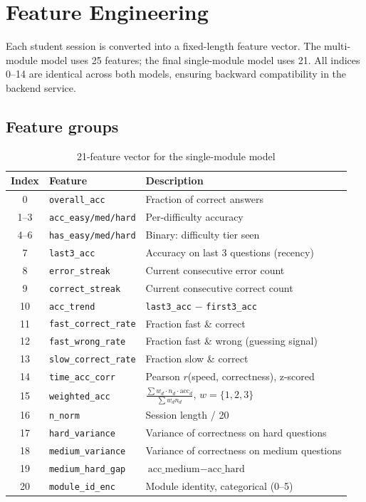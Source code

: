 \documentclass[12pt,a4paper]{article}
\begin{document}
\section{Feature Engineering}
\label{sec:features}

Each student session is converted into a fixed-length feature vector.
The multi-module model uses 25 features; the final single-module model uses 21.
All indices 0--14 are identical across both models, ensuring backward compatibility
in the backend service.

\subsection{Feature groups}

\begin{table}[H]
\centering
\caption{21-feature vector for the single-module model}
\begin{tabular}{@{}clp{7cm}@{}}
\toprule
Index & Feature & Description \\
\midrule
0     & \texttt{overall\_acc}       & Fraction of correct answers \\
1--3  & \texttt{acc\_easy/med/hard} & Per-difficulty accuracy \\
4--6  & \texttt{has\_easy/med/hard} & Binary: difficulty tier seen \\
7     & \texttt{last3\_acc}         & Accuracy on last 3 questions (recency) \\
8     & \texttt{error\_streak}      & Current consecutive error count \\
9     & \texttt{correct\_streak}    & Current consecutive correct count \\
10    & \texttt{acc\_trend}         & \texttt{last3\_acc} $-$ \texttt{first3\_acc} \\
11    & \texttt{fast\_correct\_rate}& Fraction fast \& correct \\
12    & \texttt{fast\_wrong\_rate}  & Fraction fast \& wrong (guessing signal) \\
13    & \texttt{slow\_correct\_rate}& Fraction slow \& correct \\
14    & \texttt{time\_acc\_corr}    & Pearson $r$(speed, correctness), z-scored \\
15    & \texttt{weighted\_acc}      & $\frac{\sum w_d \cdot n_d \cdot \text{acc}_d}{\sum w_d n_d}$, $w=\{1,2,3\}$ \\
16    & \texttt{n\_norm}            & Session length / 20 \\
17    & \texttt{hard\_variance}     & Variance of correctness on hard questions \\
18    & \texttt{medium\_variance}   & Variance of correctness on medium questions \\
19    & \texttt{medium\_hard\_gap}  & $\text{acc\_medium} - \text{acc\_hard}$ \\
20    & \texttt{module\_id\_enc}    & Module identity, categorical (0--5) \\
\bottomrule
\end{tabular}
\end{table}
\end{document}
